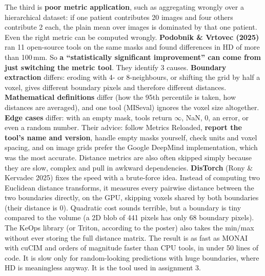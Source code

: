 \documentclass[a4paper]{article}
\newcommand{\K}[1]{\textcolor{kg}{\textbf{#1}}}
\newcommand{\E}[1]{\textcolor{ep}{#1}}
\newcommand{\T}[1]{\textcolor{tr}{\textbf{#1}}}
\begin{document}
The third is \K{poor metric application}, such as aggregating wrongly over a hierarchical dataset: if one patient contributes 20 images and four others contribute 2 each, the plain mean over images is dominated by that one patient.
Even the right metric can be computed wrongly. \K{Podobnik \& Vrtovec (2025)} ran 11 open-source tools on the same masks and found differences in HD of \E{more than 100\,mm}. So \T{a ``statistically significant improvement'' can come from just switching the metric tool}. They identify 3 causes. \K{Boundary extraction} differs: eroding with 4- or 8-neighbours, or shifting the grid by half a voxel, gives different boundary pixels and therefore different distances. \K{Mathematical definitions} differ (how the 95th percentile is taken, how distances are averaged), and one tool (MISeval) ignores the voxel size altogether. \K{Edge cases} differ: with an empty mask, tools return $\infty$, NaN, 0, an error, or even a random number.
Their advice: follow Metrics Reloaded, \K{report the tool's name and version}, handle empty masks yourself, check units and voxel spacing, and on image grids prefer the Google DeepMind implementation, which was the most accurate. Distance metrics are also often skipped simply because they are slow, complex and pull in awkward dependencies. \K{DisTorch} (Rony \& Kervadec 2025) fixes the speed with a brute-force idea. Instead of computing two Euclidean distance transforms, it measures every pairwise distance between the two boundaries directly, on the GPU, skipping voxels shared by both boundaries (their distance is 0). Quadratic cost sounds terrible, but a boundary is tiny compared to the volume (\E{a 2D blob of 441 pixels has only 68 boundary pixels}). The KeOps library (or Triton, according to the poster) also takes the min/max without ever storing the full distance matrix. The result is as fast as MONAI with cuCIM and orders of magnitude faster than CPU tools, in under 50 lines of code. It is slow only for random-looking predictions with huge boundaries, where HD is meaningless anyway. It is the tool used in assignment 3.
\end{document}
